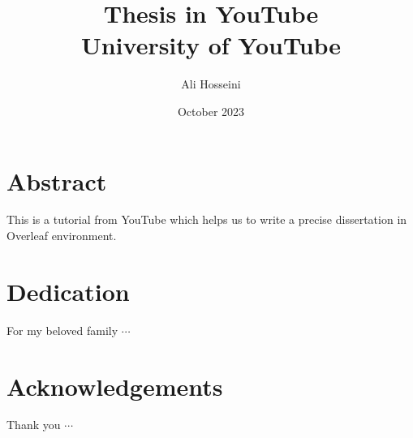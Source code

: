 \documentclass[twoside]{report}
\title{Thesis in YouTube \\
{\Large University of YouTube }}
\author{Ali Hosseini}
\date{October 2023}
\begin{document}
\maketitle

\chapter*{Abstract}
This is a tutorial from YouTube which helps us to write a precise dissertation in Overleaf environment. 

\chapter*{Dedication}
For my beloved family $\cdots$

\chapter*{Acknowledgements}
Thank you $\cdots$

\tableofcontents
\listoffigures




\appendix




\end{document}
